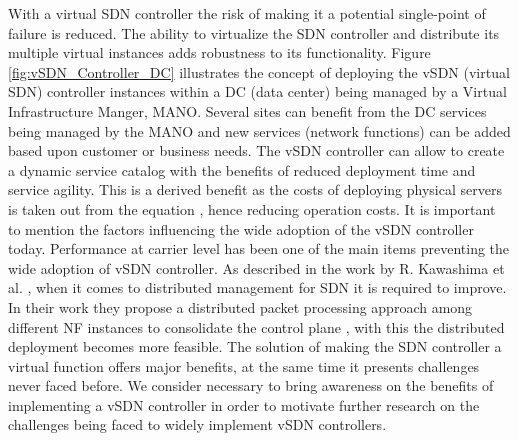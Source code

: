 \documentclass[sigconf]{Template}
\begin{document}
With a virtual SDN controller the risk of making it a potential single-point of failure is reduced. The ability to virtualize the SDN controller and distribute its multiple virtual instances adds robustness to its functionality. Figure \ref{fig:vSDN_Controller_DC} illustrates the concept of deploying the vSDN (virtual SDN) controller instances within a DC (data center) being managed by a Virtual Infrastructure Manger, MANO. Several sites can benefit from the DC services being managed by the MANO and new services (network functions) can be added based upon customer or business needs. The vSDN controller can allow to create a dynamic service catalog with the benefits of reduced deployment time and service agility. This is a derived benefit as the costs of deploying physical servers is taken out from the equation \cite{mijumbi2016_NFV_stateofart}, hence reducing operation costs. 
It is important to mention the factors influencing the wide adoption of the vSDN controller today. Performance at carrier level has been one of the main items preventing the wide adoption of vSDN controller. As described in the work by R. Kawashima et al. \cite{kawashima2012_vnfc}, when it comes to distributed management for SDN it is required to improve. In their work they propose a distributed packet processing approach among different NF instances to consolidate the control plane \cite{kawashima2012_vnfc}, with this the distributed deployment becomes more feasible.
The solution of making the SDN controller a virtual function offers major benefits, at the same time it presents challenges never faced before. We consider necessary to bring awareness on the benefits of implementing a vSDN controller in order to motivate further research on the challenges being faced to widely implement vSDN controllers.
\newpage
\end{document}
